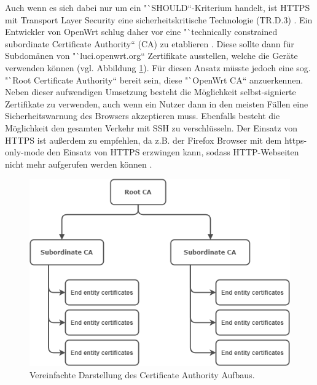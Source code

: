 \documentclass[a4paper]{book}
\begin{document}
\begin{large}
\begin{onehalfspace}
Auch wenn es sich dabei nur um ein "`SHOULD“-Kriterium handelt, ist HTTPS mit Transport Layer Security eine sicherheitskritische Technologie (TR.D.3) \cite{TheInternetSociety.2000}. Ein Entwickler von OpenWrt schlug daher vor eine "`technically constrained subordinate Certificate Authority“ (CA) zu etablieren \cite{Edge.2020}. Diese sollte dann für Subdomänen von "`luci.openwrt.org“ Zertifikate ausstellen, welche die Geräte verwenden können (vgl. Abbildung \ref{fig:CA}). Für diesen Ansatz müsste jedoch eine sog. "`Root Certificate Authority“ bereit sein, diese "`OpenWrt CA“ anzuerkennen. Neben dieser aufwendigen Umsetzung besteht die Möglichkeit selbst-signierte Zertifikate zu verwenden, auch wenn ein Nutzer dann in den meisten Fällen eine Sicherheitswarnung des Browsers akzeptieren muss. Ebenfalls besteht die Möglichkeit den gesamten Verkehr mit SSH zu verschlüsseln. Der Einsatz von HTTPS ist außerdem zu empfehlen, da z.B. der Firefox Browser mit dem \glqq https-only-mode\grqq{} den Einsatz von HTTPS erzwingen kann, sodass HTTP-Webseiten nicht mehr aufgerufen werden können \cite{MozillaFoundation.2020}.\\

\begin{figure}[ht]
\begin{center}
\includegraphics[scale=0.4]{images/CA} 
\caption{Vereinfachte Darstellung des Certificate Authority Aufbaus.}
\label{fig:CA}
\end{center}
\end{figure}	


\end{onehalfspace}
\end{large}
\end{document}
